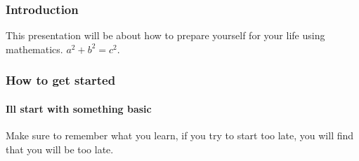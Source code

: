 \documentclass{beamer}
\begin{document}
  \begin{frame}
    \frametitle{Introduction}
    This presentation will be about how to prepare yourself for your life using
    mathematics.
    $a^2 + b^2 = c^2$.    
  \end{frame}
  \begin{frame}
    \frametitle{How to get started}
    \framesubtitle{Ill start with something basic}
    Make sure to remember what you learn, if you try to start too late, you will find that you will be too late.  
  \end{frame}
\end{document}
